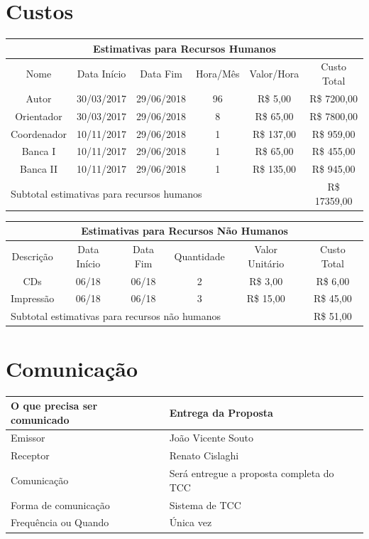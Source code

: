 \documentclass[
	12pt,				%
	openright,			%
	twoside,			%
	a4paper,			%
	english,			%
	brazil,				%
	]{abntex2}
\begin{document}
\section{Custos}

\begin{center}
\begin{tabular}{|c|c|c|c|c|c|}
\hline
\multicolumn{6}{|c|}{Estimativas para Recursos Humanos} \\ \hline
    Nome & Data Início & Data Fim & Hora/Mês & Valor/Hora & Custo Total \\ \hline
    Autor & 30/03/2017 & 29/06/2018 &  96 & R\$ 5,00 & R\$ 7200,00 \\ \hline
    Orientador & 30/03/2017 & 29/06/2018 & 8 & R\$ 65,00 & R\$ 7800,00 \\ \hline
    Coordenador & 10/11/2017 & 29/06/2018 & 1 & R\$ 137,00 & R\$ 959,00 \\ \hline
    Banca I & 10/11/2017 & 29/06/2018 & 1 & R\$ 65,00 & R\$ 455,00 \\ \hline
    Banca II & 10/11/2017 & 29/06/2018 & 1 & R\$ 135,00 & R\$ 945,00 \\ \hline
\multicolumn{5}{|l|}{Subtotal estimativas para recursos humanos} & R\$ 17359,00 \\
\hline
\end{tabular}
\end{center}

\begin{center}
\begin{tabular}{|c|c|c|c|c|c|}
\hline
\multicolumn{6}{|c|}{Estimativas para Recursos Não Humanos} \\ \hline
    Descrição & Data Início & Data Fim & Quantidade & Valor Unitário & Custo Total \\
    \hline
    CDs & 06/18 & 06/18 & 2 & R\$ 3,00 & R\$ 6,00 \\ \hline
    Impressão & 06/18 & 06/18 & 3 & R\$ 15,00 & R\$ 45,00 \\ \hline
\multicolumn{5}{|l|}{Subtotal estimativas para recursos não humanos} & R\$ 51,00 \\
\hline
\end{tabular}
\end{center}

\section{Comunicação}

\begin{center}
\begin{tabular}{|l|p{9cm}|}
\hline
    O que precisa ser comunicado & Entrega da Proposta \\ \hline
    Emissor & João Vicente Souto \\ \hline
    Receptor & Renato Cislaghi \\ \hline
    Comunicação & Será entregue a proposta completa do TCC \\ \hline
    Forma de comunicação & Sistema de TCC \\ \hline
    Frequência ou Quando & Única vez \\ \hline
\end{tabular}
\end{center}
\end{document}
